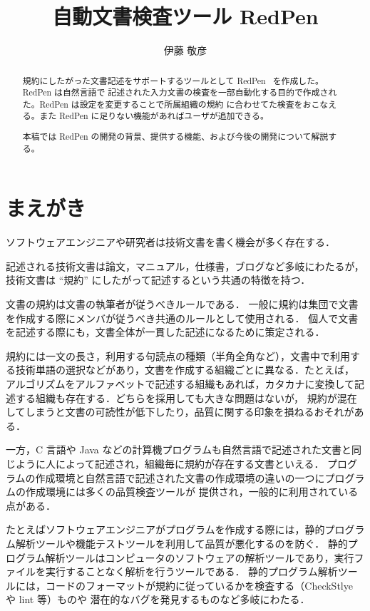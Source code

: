 \documentclass[a4paper, 10pt]{jarticle}
\title{自動文書検査ツール RedPen}
\author{伊藤 敬彦}
\begin{document}
\maketitle
\begin{abstract}
規約にしたがった文書記述をサポートするツールとして RedPen~\cite{redpen} を作成した。RedPen は自然言語で
記述された入力文書の検査を一部自動化する目的で作成された。RedPen は設定を変更することで所属組織の規約
に合わせてた検査をおこなえる。また RedPen に足りない機能があればユーザが追加できる。

本稿では RedPen の開発の背景、提供する機能、および今後の開発について解説する。
\end{abstract}

\section{まえがき}

ソフトウェアエンジニアや研究者は技術文書を書く機会が多く存在する．

記述される技術文書は論文，マニュアル，仕様書，ブログなど多岐にわたるが，技術文書は ``規約'' にしたがって記述するという共通の特徴を持つ．

文書の規約は文書の執筆者が従うべきルールである．
一般に規約は集団で文書を作成する際にメンバが従うべき共通のルールとして使用される．
個人で文書を記述する際にも，文書全体が一貫した記述になるために策定される．

規約には一文の長さ，利用する句読点の種類（半角全角など），文書中で利用する技術単語の選択などがあり，文書を作成する組織ごとに異なる．たとえば，
アルゴリズムをアルファベットで記述する組織もあれば，カタカナに変換して記述する組織も存在する．どちらを採用しても大きな問題はないが，
規約が混在してしまうと文書の可読性が低下したり，品質に関する印象を損ねるおそれがある．

一方，C 言語や Java などの計算機プログラムも自然言語で記述された文書と同じように人によって記述され，組織毎に規約が存在する文書といえる．
プログラムの作成環境と自然言語で記述された文書の作成環境の違いの一つにプログラムの作成環境には多くの品質検査ツールが
提供され，一般的に利用されている点がある．

たとえばソフトウェアエンジニアがプログラムを作成する際には，静的プログラム解析ツールや機能テストツールを利用して品質が悪化するのを防ぐ．
静的プログラム解析ツールはコンピュータのソフトウェアの解析ツールであり，実行ファイルを実行することなく解析を行うツールである．
静的プログラム解析ツールには，コードのフォーマットが規約に従っているかを検査する（CheckStlye~\cite{checkstyle} や lint 等）ものや
潜在的なバグを発見するものなど多岐にわたる．
\end{document}
